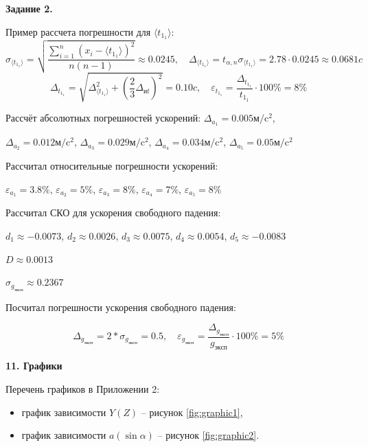 \documentclass[14pt]{extreport}
\begin{document}
\textbf{Задание 2.}

Пример рассчета погрешности для ${\langle t_{1_1} \rangle}$:
\begin{equation*}
    \sigma_{\langle t_{1_1} \rangle}=\sqrt{\frac{\sum\limits_{i=1}^{n}(x_i - {\langle t_{1_1} \rangle})^2}{n(n-1)}} \approx 0.0245, \quad
    \Delta_{\langle t_{1_1} \rangle}=t_{\alpha, n}\sigma_{\langle t_{1_1} \rangle} = 2.78 \cdot 0.0245 \approx 0.0681c
\end{equation*}
\begin{equation*}
    \Delta_{t_{1_1}}=\sqrt{\Delta_{\langle {t_{1_1}} \rangle}^2+(\frac{2}{3}\Delta_{\text{и}t})^2} = 0.10c, \quad \varepsilon_{t_{1_1}}=\frac{\Delta_{t_{1_1}}}{{t_{1_1}}}\cdot100\% = 8\%
\end{equation*}

Рассчёт абсолютных погрешностей ускорений: $\Delta_{a_1} = 0.005\text{м}/\text{c}^2$, 

$\Delta_{a_2} = 0.012\text{м}/\text{c}^2$, $\Delta_{a_3} = 0.029\text{м}/\text{c}^2$, $\Delta_{a_4} = 0.034\text{м}/\text{c}^2$, $\Delta_{a_5} = 0.05\text{м}/\text{c}^2$

Рассчитал относительные погрешности ускорений:

$\varepsilon_{a_1} = 3.8\%$, $\varepsilon_{a_2} = 5\%$, $\varepsilon_{a_3} = 8\%$, $\varepsilon_{a_4} = 7\%$, $\varepsilon_{a_5} = 8\%$

Рассчитал СКО для ускорения свободного падения:

$d_1 \approx -0.0073$, $d_2 \approx 0.0026$, $d_3 \approx 0.0075$, $d_4 \approx 0.0054$, $d_5 \approx -0.0083$

$D \approx 0.0013$

$\sigma_{g_\text{эксп}} \approx 0.2367$

Посчитал погрешности ускорения свободного падения:

\begin{equation*}
\Delta_{g_\text{эксп}} = 2*\sigma_{g_\text{эксп}} = 0.5, \quad \varepsilon_{g_\text{эксп}}=\frac{\Delta_{g_\text{эксп}}}{g_\text{эксп}}\cdot100\% = 5\%
\end{equation*}

\noindent\textbf{11. Графики }

Перечень графиков в Приложении 2: 
\begin{itemize}
    \item график зависимости $Y(Z)$ -- рисунок \ref{fig:graphic1},
    \item график зависимости $a(\sin\alpha)$ -- рисунок \ref{fig:graphic2}.
\end{itemize}
\end{document}
